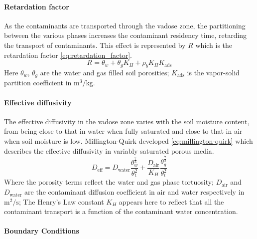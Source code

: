 \paragraph{Retardation factor}

As the contaminants are transported through the vadose zone, the partitioning between the various phases increases the contaminant residency time, retarding the transport of contaminants.
This effect is represented by $R$ which is the retardation factor \eqref{eq:retardation_factor}.
\begin{equation}\label{eq:retardation_factor}
  R = \theta_w + \theta_g K_H + \rho_b K_H K_\mathrm{ads}
\end{equation}
Here $\theta_w$, $\theta_g$ are the water and gas filled soil porosities;
$K_\mathrm{ads}$ is the vapor-solid partition coefficient in $\mathrm{m^3/kg}$.\par

\paragraph{Effective diffusivity}

The effective diffusivity in the vadose zone varies with the soil moisture content, from being close to that in water when fully saturated and close to that in air when soil moisture is low.
Millington-Quirk developed \eqref{eq:millington-quirk} which describes the effective diffusivity in variably saturated porous media.
\begin{equation}\label{eq:millington-quirk}
  D_\mathrm{eff} = D_\mathrm{water} \frac{\theta_w^\frac{7}{3}}{\theta_t^2} + \frac{D_\mathrm{air}}{K_H} \frac{\theta_g^\frac{7}{3}}{\theta_t^2}
\end{equation}
Where the porosity terms reflect the water and gas phase tortuosity;
$D_\mathrm{air}$ and $D_\mathrm{water}$ are the contaminant diffusion coefficient in air and water respectively in $\mathrm{m^2/s}$;
The Henry's Law constant $K_H$ appears here to reflect that all the contaminant transport is a function of the contaminant water concentration.\par

\paragraph{Boundary Conditions}

